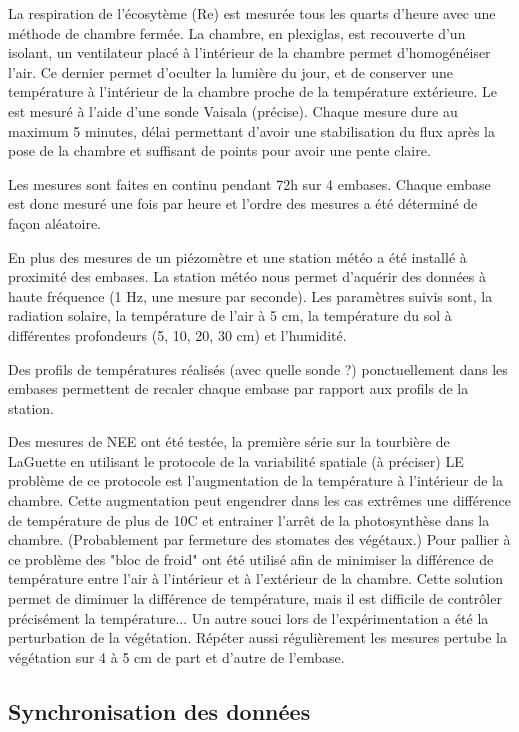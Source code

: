 La respiration de l'écosytème (Re) est mesurée tous les quarts d'heure avec une méthode de chambre fermée.
La chambre, en plexiglas, est recouverte d'un isolant, un ventilateur placé à l'intérieur de la chambre permet d'homogénéiser l'air.
Ce dernier permet d'oculter la lumière du jour, et de conserver une température à l'intérieur de la chambre proche de la température extérieure.
Le \coo est mesuré à l'aide d'une sonde Vaisala (\plop précise).
Chaque mesure dure au maximum 5 minutes, délai permettant d'avoir une stabilisation du flux après la pose de la chambre et suffisant de points pour avoir une pente claire.

Les mesures sont faites en continu pendant 72h sur 4 embases. 
Chaque embase est donc mesuré une fois par heure et l'ordre des mesures a été déterminé de façon aléatoire.

En plus des mesures de \coo un piézomètre et une station météo a été installé à proximité des embases.
La station météo nous permet d'aquérir des données à haute fréquence (1 Hz, une mesure par seconde).
Les paramètres suivis sont, la radiation solaire, la température de l'air à 5 cm, la température du sol à différentes profondeurs (5, 10, 20, 30 cm) et l'humidité.

Des profils de températures réalisés (avec quelle sonde ?) ponctuellement dans les embases permettent de recaler chaque embase par rapport aux profils de la station.

Des mesures de NEE ont été testée, la première série sur la tourbière de LaGuette en utilisant le protocole de la variabilité spatiale (à préciser)
LE problème de ce protocole est l'augmentation de la température à l'intérieur de la chambre.
Cette augmentation peut engendrer dans les cas extrêmes une différence de température de plus de 10\degres C et entrainer l'arrêt de la photosynthèse dans la chambre.
(Probablement par fermeture des stomates des végétaux.)
Pour pallier à ce problème des "bloc de froid" ont été utilisé afin de minimiser la différence de température entre l'air à l'intérieur et à l'extérieur de la chambre.
Cette solution permet de diminuer la différence de température, mais il est difficile de contrôler précisément la température...
Un autre souci lors de l'expérimentation a été la perturbation de la végétation.
Répéter aussi régulièrement les mesures pertube la végétation sur 4 à 5 cm de part et d'autre de l'embase.

\subsection{Synchronisation des données}

